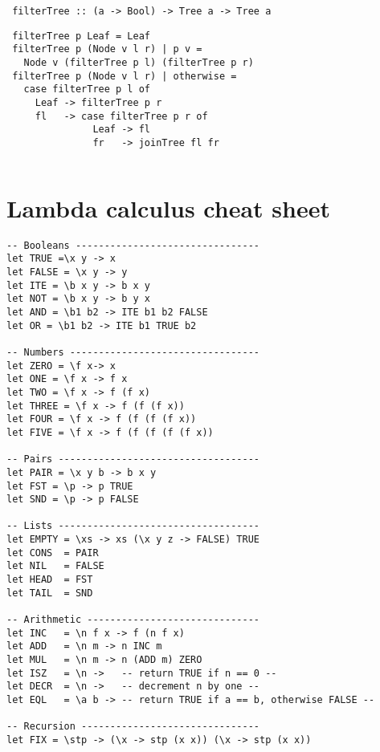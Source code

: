 \documentclass[paper=letter, fontsize=13pt]{article} %
\numberwithin{equation}{section} %
\newif\ifshowanswers\showanswerstrue
\begin{document}
\begin{enumerate}
\begin{verbatim}
 filterTree :: (a -> Bool) -> Tree a -> Tree a
\end{verbatim}

\ifshowanswers 
\begin{lstlisting}
 filterTree p Leaf = Leaf
 filterTree p (Node v l r) | p v = 
   Node v (filterTree p l) (filterTree p r) 
 filterTree p (Node v l r) | otherwise = 
   case filterTree p l of 
     Leaf -> filterTree p r
     fl   -> case filterTree p r of
               Leaf -> fl
               fr   -> joinTree fl fr
\end{lstlisting}
    \else
     \bigskip
     \bigskip
     \bigskip 
     \bigskip
     \bigskip 
     \bigskip
     \bigskip
     \bigskip 
     \bigskip
     \bigskip
    \fi
 

\end{enumerate}
\newpage
\[ \]
\newpage
\section{Lambda calculus cheat sheet}
\begin{lstlisting}
-- Booleans --------------------------------
let TRUE =\x y -> x
let FALSE = \x y -> y
let ITE = \b x y -> b x y
let NOT = \b x y -> b y x
let AND = \b1 b2 -> ITE b1 b2 FALSE 
let OR = \b1 b2 -> ITE b1 TRUE b2

-- Numbers ---------------------------------
let ZERO = \f x-> x
let ONE = \f x -> f x 
let TWO = \f x -> f (f x) 
let THREE = \f x -> f (f (f x))
let FOUR = \f x -> f (f (f (f x))
let FIVE = \f x -> f (f (f (f (f x))

-- Pairs -----------------------------------
let PAIR = \x y b -> b x y 
let FST = \p -> p TRUE 
let SND = \p -> p FALSE

-- Lists -----------------------------------
let EMPTY = \xs -> xs (\x y z -> FALSE) TRUE
let CONS  = PAIR
let NIL   = FALSE
let HEAD  = FST
let TAIL  = SND

-- Arithmetic ------------------------------
let INC   = \n f x -> f (n f x)
let ADD   = \n m -> n INC m 
let MUL   = \n m -> n (ADD m) ZERO
let ISZ   = \n ->   -- return TRUE if n == 0 --
let DECR  = \n ->   -- decrement n by one --  
let EQL   = \a b -> -- return TRUE if a == b, otherwise FALSE --

-- Recursion -------------------------------
let FIX = \stp -> (\x -> stp (x x)) (\x -> stp (x x))
\end{lstlisting}

\newpage
\end{document}
